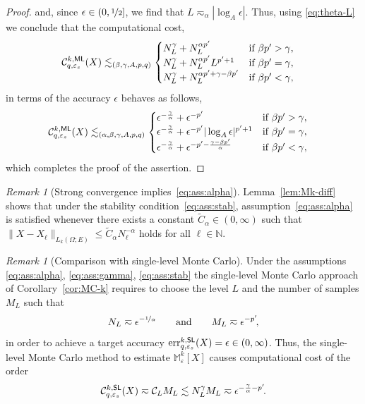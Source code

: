 \documentclass[reqno]{amsart}
\numberwithin{equation}{section}
\newcommand{\bbM}{\mathbb{M}}
\newcommand{\bbN}{\mathbb{N}}
\newcommand{\cC}{\mathcal{C}}
\newcommand{\Mk}{\bbM^k_\varepsilon}
\newcommand{\norm}[2]{     \| #1       \|_{ #2 }}
\newcommand{\eps}{\varepsilon}
\theoremstyle{remark}
\newtheorem{remark}[lemma]{Remark}
\theoremstyle{definition}
\begin{document}
\begin{proof}
	and, since $\epsilon\in(0,\nicefrac{1}{2}]$, 
	we find that $L \eqsim_{\alpha} |\log_A \epsilon|$. 
	Thus, using \eqref{eq:theta-L} 
	we conclude that the computational cost, 
	\begin{align*} 
	&\cC^{k, \sf ML}_{q,\eps_s}(X) 
	\lesssim_{(\beta,\gamma,A,p,q)}  
	\begin{cases} 
	N_L^\gamma 
	+ 
	N_L^{\alpha p'}  
	&\text{if } 
	\beta p' > \gamma, \\
	N_L^\gamma 
	+ 
	N_L^{\alpha p'} 
	L^{p'+1}  
	&\text{if }  
	\beta p' = \gamma, \\
	N_L^\gamma 
	+ 
	N_L^{\alpha p'+\gamma-\beta p'} 
	&\text{if }  
	\beta p' < \gamma, 
	\end{cases}
	\end{align*} 
	 in terms of the accuracy 
	$\epsilon$ behaves as follows, 
	\begin{align*} 
	&\cC^{k, \sf ML}_{q,\eps_s}(X) 
	\lesssim_{(\alpha,\beta,\gamma,A,p,q)}  
	\begin{cases} 
	\epsilon^{-\frac{\gamma}{\alpha}} 
	+ 
	\epsilon^{-p'} 
	&\text{if } 
	\beta p' > \gamma, \\
	\epsilon^{-\frac{\gamma}{\alpha}} 
	+ 
	\epsilon^{-p'} 
	|\log_A \epsilon|^{p'+1} 
	&\text{if }  
	\beta p' = \gamma, \\
	\epsilon^{-\frac{\gamma}{\alpha}} 
	+ 
	\epsilon^{-p' - \frac{\gamma - \beta p'}{\alpha}} 
	&\text{if }  
	\beta p' < \gamma, 
	\end{cases}
	\end{align*} 
	which completes the proof of the assertion. 
\end{proof} 

\begin{remark}[Strong convergence implies~\eqref{eq:ass:alpha}]
	\label{rem:strong-alpha}
	Lemma~\ref{lem:Mk-diff} 
	shows that 
	under the stability condition~\eqref{eq:ass:stab}, 
	assumption~\eqref{eq:ass:alpha} 
	is satisfied whenever 
	there exists a constant $\widetilde{C}_\alpha\in(0,\infty)$ 
	such that 
	$\norm{X - X_\ell}{L_k(\Omega;E)} 
	\leq \widetilde{C}_\alpha 
	N_\ell^{-\alpha}$ 
	holds 
	for all $\ell\in\bbN$. 
\end{remark} 

\begin{remark}[Comparison with single-level Monte Carlo]
	\label{rem:comparison-SLMC} 
	Under the assumptions \eqref{eq:ass:alpha}, 
	\eqref{eq:ass:gamma}, \eqref{eq:ass:stab} 
	the single-level Monte Carlo approach 
	of Corollary~\ref{cor:MC-k} 
	requires to choose the level 
	$L$ and the number of samples $M_L$ such that 
	\[
	N_L \eqsim \epsilon^{-\nicefrac{1}{\alpha}} 
	\qquad 
	\text{and}
	\qquad 
	M_L \eqsim \epsilon^{-p'}\! , 
	\]
	in order to achieve a 
	target accuracy 
	$\mathrm{err}^{k, \sf SL}_{q,\eps_s}(X) = \epsilon\in(0,\infty)$. 
	Thus, the single-level Monte Carlo method 
	to estimate $\Mk[X]$ 
	causes computational cost 
	of the order  
	\[
	\cC^{k, \sf SL}_{q,\eps_s}(X) 
	\eqsim 
	\cC_L M_L 
	\lesssim 
	N_L^\gamma M_L 
	\eqsim 
	\epsilon^{-\frac{\gamma}{\alpha} - p'} \!. 
	\]
\end{remark} 
\end{document}
